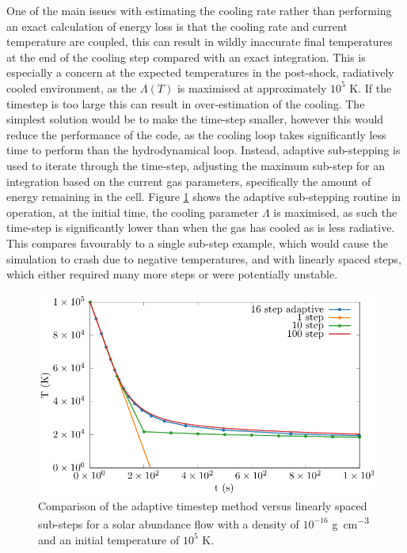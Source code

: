 One of the main issues with estimating the cooling rate rather than performing an exact calculation of energy loss is that the cooling rate and current temperature are coupled, this can result in wildly inaccurate final temperatures at the end of the cooling step compared with an exact integration.
This is especially a concern at the expected temperatures in the post-shock, radiatively cooled environment, as the $\Lambda(T)$ is maximised at approximately $10^5$ \si{\kelvin}. If the timestep is too large this can result in over-estimation of the cooling.
The simplest solution would be to make the time-step smaller, however this would reduce the performance of the code, as the cooling loop takes significantly less time to perform than the hydrodynamical loop.
Instead, adaptive sub-stepping is used to iterate through the time-step, adjusting the maximum sub-step for an integration based on the current gas parameters, specifically the amount of energy remaining in the cell.
Figure \ref{fig:cooling-loop-evolution} shows the adaptive sub-stepping routine in operation, at the initial time, the cooling parameter $\Lambda$ is maximised, as such the time-step is significantly lower than when the gas has cooled as is less radiative.
This compares favourably to a single sub-step example, which would cause the simulation to crash due to negative temperatures, and with linearly spaced steps, which either required many more steps or were potentially unstable.

\begin{figure}
  \centering
  \includegraphics{assets/plasma-cooling-benchmarks/evolution.pdf}
  \caption[Cooling sub-step method evolution comparison]{Comparison of the adaptive timestep method versus linearly spaced sub-steps for a solar abundance flow with a density of $10^{-16}$ \si{\gram\per\centi\metre\cubed} and an initial temperature of $10^5$ \si{\kelvin}.}
  \label{fig:cooling-loop-evolution}
\end{figure}

